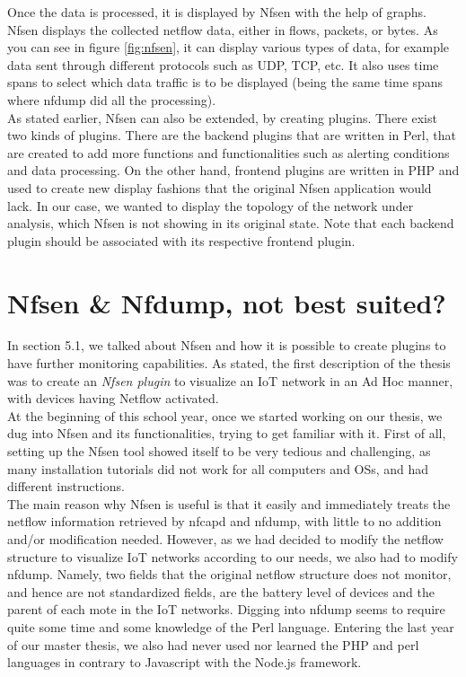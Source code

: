 Once the data is processed, it is displayed by Nfsen with the help of graphs. Nfsen displays the collected netflow data, either in flows, packets, or bytes. As you can see in figure \ref{fig:nfsen}, it can display various types of data, for example data sent through different protocols such as UDP, TCP, etc. It also uses time spans to select which data traffic is to be displayed (being the same time spans where nfdump did all the processing).\\

As stated earlier, Nfsen can also be extended, by creating plugins. There exist two kinds of plugins. There are the backend plugins that are written in Perl, that are created to add more functions and functionalities such as alerting conditions and data processing. On the other hand, frontend plugins are written in PHP and used to create new display fashions that the original Nfsen application would lack. In our case, we wanted to display the topology of the network under analysis, which Nfsen is not showing in its original state. Note that each backend plugin should be associated with its respective frontend plugin.

\section{Nfsen \& Nfdump, not best suited?}

In section 5.1, we talked about Nfsen and how it is possible to create plugins to have further monitoring capabilities. As stated, the first description of the thesis was to create an \textit{Nfsen plugin} to visualize an IoT network in an Ad Hoc manner, with devices having Netflow activated.\\

At the beginning of this school year, once we started working on our thesis, we dug into Nfsen and its functionalities, trying to get familiar with it. First of all, setting up the Nfsen tool showed itself to be very tedious and challenging, as many installation tutorials did not work for all computers and OSs, and had different instructions.\\

The main reason why Nfsen is useful is that it easily and immediately treats the netflow information retrieved by nfcapd and nfdump, with little to no addition and/or modification needed. However, as we had decided to modify the netflow structure to visualize IoT networks according to our needs, we also had to modify nfdump. Namely, two fields that the original netflow structure does not monitor, and hence are not standardized fields, are the battery level of devices and the parent of each mote in the IoT networks. Digging into nfdump seems to require quite some time and some knowledge of the Perl language. Entering the last year of our master thesis, we also had never used nor learned the PHP and perl languages in contrary to Javascript with the Node.js framework. \\

